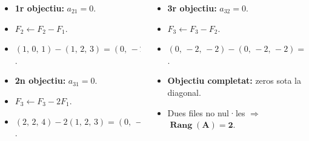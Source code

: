 \documentclass[aspectratio=169]{beamer}
\newcommand{\solucio}[1]{{\color{margueVerdFosc}\ensuremath{\mathbf{#1}}}}
\begin{document}
\begin{frame}[t]
  \vspace{0.08cm}
  \begin{columns}[T,onlytextwidth]
    \begin{column}{0.48\textwidth}
      \begin{itemize}
        \item<4-> \textbf{1r objectiu:} $a_{21} = 0$.
        \item<5-> $F_2 \leftarrow F_2 - F_1$.
        \item<6-> $(1,\,0,\,1) - (1,\,2,\,3) = (0,\,-2,\,-2)$.
        \item<7-> \textbf{2n objectiu:} $a_{31} = 0$.
        \item<8-> $F_3 \leftarrow F_3 - 2F_1$.
        \item<9-> $(2,\,2,\,4) - 2(1,\,2,\,3) = (0,\,-2,\,-2)$.
      \end{itemize}
    \end{column}
    \begin{column}{0.48\textwidth}
      \begin{itemize}
        \item<11-> \textbf{3r objectiu:} $a_{32} = 0$.
        \item<12-> $F_3 \leftarrow F_3 - F_2$.
        \item<13-> $(0,\,-2,\,-2) - (0,\,-2,\,-2) = (0,\,0,\,0)$.
        \item<14-> \textbf{Objectiu completat:} zeros sota la diagonal.
        \item<15-> Dues files no nul·les $\Rightarrow$ \solucio{\operatorname{Rang}(A) = 2}.
      \end{itemize}
    \end{column}
  \end{columns}
\end{frame}
\end{document}
